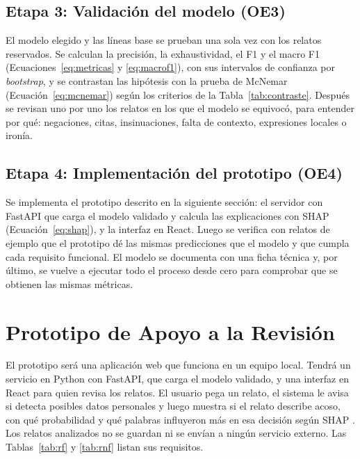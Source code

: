 \subsection{Etapa 3: Validación del modelo (OE3)}
El modelo elegido y las líneas base se prueban una sola vez con los relatos reservados. Se calculan la precisión, la exhaustividad, el F1 y el macro F1 (Ecuaciones~\ref{eq:metricas} y \ref{eq:macrof1}), con sus intervalos de confianza por \textit{bootstrap}, y se contrastan las hipótesis con la prueba de McNemar (Ecuación~\ref{eq:mcnemar}) según los criterios de la Tabla~\ref{tab:contraste}. Después se revisan uno por uno los relatos en los que el modelo se equivocó, para entender por qué: negaciones, citas, insinuaciones, falta de contexto, expresiones locales o ironía.

\subsection{Etapa 4: Implementación del prototipo (OE4)}
Se implementa el prototipo descrito en la siguiente sección: el servidor con FastAPI que carga el modelo validado y calcula las explicaciones con SHAP (Ecuación~\ref{eq:shap}), y la interfaz en React. Luego se verifica con relatos de ejemplo que el prototipo dé las mismas predicciones que el modelo y que cumpla cada requisito funcional. El modelo se documenta con una ficha técnica \citep{mitchell2019} y, por último, se vuelve a ejecutar todo el proceso desde cero para comprobar que se obtienen las mismas métricas.

\section{Prototipo de Apoyo a la Revisión}
El prototipo será una aplicación web que funciona en un equipo local. Tendrá un servicio en Python con FastAPI, que carga el modelo validado, y una interfaz en React para quien revisa los relatos. El usuario pega un relato, el sistema le avisa si detecta posibles datos personales y luego muestra si el relato describe acoso, con qué probabilidad y qué palabras influyeron más en esa decisión según SHAP \citep{lundberg2017}. Los relatos analizados no se guardan ni se envían a ningún servicio externo. Las Tablas~\ref{tab:rf} y \ref{tab:rnf} listan sus requisitos.

